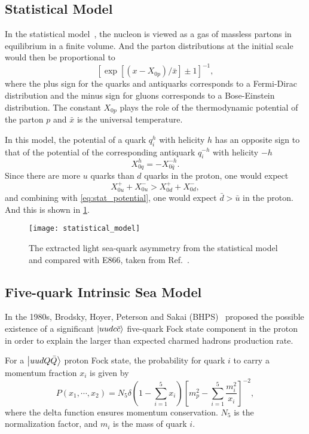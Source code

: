 \documentclass[../main.tex]{subfiles}
\begin{document}
\subsection{Statistical Model}
In the statistical model~\cite{bourrely2015}, the nucleon is viewed as a gas of massless partons in equilibrium in
a finite volume. And the parton distributions at the initial scale would then be proportional to
\begin{equation}
	\left[ \exp\left[\left(x-X_{0p}\right)/\bar{x}\right] \pm 1 \right]^{-1},
\end{equation}
where the plus sign for the quarks and antiquarks corresponds to a Fermi-Dirac distribution and
the minus sign for gluons corresponds to a Bose-Einstein distribution. The constant $X_{0p}$
plays the role of the thermodynamic potential of the parton $p$ and $\bar{x}$ is the universal
temperature.

In this model, the potential of a quark $q_i^h$ with helicity $h$ has an opposite sign to that of the
potential of the corresponding antiquark $q_i^{-h}$ with helicity $-h$
\begin{equation}
	X_{0q}^h = -X_{0\bar{q}}^{-h}.
	\label{eq:stat_potential}
\end{equation}
Since there are more $u$ quarks than $d$ quarks in the proton, one would expect
\begin{equation}
	X_{0u}^+ + X_{0u}^- > X_{0d}^+ + X_{0d}^-,
\end{equation}
and combining with \cref{eq:stat_potential}, one would expect $\bar{d} > \bar{u}$ in the proton.
And this is shown in \cref{fig:stat_dbub}.
\begin{figure}[h]
	\centering
	\texttt{[image: statistical\_model]}
	\caption{The extracted light sea-quark asymmetry from the statistical model and compared with E866, taken
		from Ref.~\cite{soffer2019}.}
	\label{fig:stat_dbub}
\end{figure}


\subsection{Five-quark Intrinsic Sea Model}
In the 1980s, Brodsky, Hoyer, Peterson and Sakai (BHPS)~\cite{brodsky1980} proposed
the possible existence of a significant $\ket{uudc\bar{c}}$ five-quark Fock state component
in the proton in order to explain the larger than expected charmed hadrons production rate.

For a $\ket{uudQ\bar{Q}}$ proton Fock state, the probability for quark $i$ to carry a momentum
fraction $x_i$ is given by
\begin{equation}
	P\left(x_1,\cdots,x_2\right)=N_5 \delta\left(1-\sum^5_{i=1}x_i\right)\left[m_p^2-\sum^5_{i=1}\frac{m_i^2}{x_i}\right]^{-2},
\end{equation}
where the delta function ensures momentum conservation. $N_5$ is the normalization factor,
and $m_i$ is the mass of quark $i$.
\end{document}
